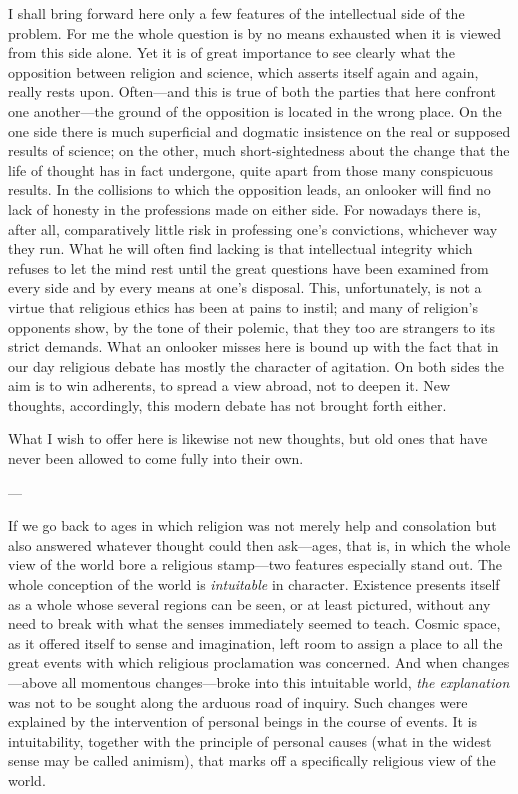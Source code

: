 \documentclass[12pt,a4paper]{article}
\newcommand{\opage}[1]{\marginnote{\footnotesize\textit{[#1]}}}
\begin{document}
I shall bring forward here only a few features of the intellectual side of
the problem. For me the whole question is by no means exhausted when it is
viewed from this side alone. Yet it is of great importance to see clearly
what the opposition between religion and science, which asserts itself again
and again, really rests upon. Often---and this is true of both the parties
that here confront one another---the ground of the opposition is located in
the wrong place. On the one side there is much superficial and dogmatic
insistence on the real or supposed results of science; on the other, much
short-sightedness about the change that the life of thought has in fact
undergone, quite apart from those many conspicuous results. In the
collisions to which the opposition leads, an onlooker will find no lack of
honesty in the professions made on either side. For nowadays there is, after
all, comparatively little risk in professing \opage{3}one's convictions, whichever way
they run. What he will often find lacking is that intellectual integrity
which refuses to let the mind rest until the great questions have been
examined from every side and by every means at one's disposal. This,
unfortunately, is not a virtue that religious ethics has been at pains to
instil; and many of religion's opponents show, by the tone of their polemic,
that they too are strangers to its strict demands. What an onlooker misses
here is bound up with the fact that in our day religious debate has mostly
the character of agitation. On both sides the aim is to win adherents, to
spread a view abroad, not to deepen it. New thoughts, accordingly, this
modern debate has not brought forth either.

What I wish to offer here is likewise not new thoughts, but old ones that
have never been allowed to come fully into their own.

\begin{center}---\end{center}

If we go back to ages in which religion was not merely help and consolation
but also answered whatever thought could then ask---ages, that is, in which
the whole view of the world bore a religious stamp---two features especially
stand out. The whole conception of the world is \emph{intuitable} in character.
Existence presents itself as a whole whose several regions can be seen, or at
least pictured, without any need to break with what the senses immediately
seemed to teach. Cosmic space, as it offered itself to sense and imagination,
left room to assign a place to all the great events with which religious
proclamation was concerned. And when changes---above all momentous
changes---broke into this intuitable world, \emph{the explanation} was not to
be sought along the arduous road of inquiry. Such changes were explained by
the intervention of personal beings \opage{4}in the course of events. It is
intuitability, together with the principle of personal causes (what in the
widest sense may be called animism), that marks off a specifically religious
view of the world.
\end{document}

